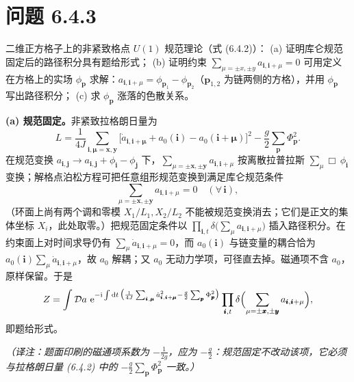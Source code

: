 \section*{问题 6.4.3}
\begin{problem}
二维正方格子上的非紧致格点 $U(1)$ 规范理论（式 (6.4.2)）：
(a) 证明库仑规范固定后的路径积分具有题给形式；
(b) 证明约束 $\sum_{\mu=\pm x,\pm y}a_{\pmb i,\pmb i+\mu}=0$ 可用定义在方格上的实场 $\phi_{\pmb p}$ 求解：$a_{\pmb i,\pmb i+\mu}=\phi_{\pmb p_1}-\phi_{\pmb p_2}$（$\pmb p_{1,2}$ 为链两侧的方格），并用 $\phi_{\pmb p}$ 写出路径积分；
(c) 求 $\phi_{\pmb p}$ 涨落的色散关系。
\end{problem}
\solution

\textbf{(a) 规范固定。}非紧致拉格朗日量为
\begin{equation*}
L=\frac{1}{4J}\sum_{\pmb i,\pmb\mu=\pmb x,\pmb y}\bigl[\dot a_{\pmb i,\pmb i+\pmb\mu}+a_0(\pmb i)-a_0(\pmb i+\pmb\mu)\bigr]^{2}
-\frac{g}{2}\sum_{\pmb p}\Phi_{\pmb p}^{2} .
\end{equation*}
在规范变换 $a_{\pmb i,\pmb j}\to a_{\pmb i,\pmb j}+\phi_{\pmb i}-\phi_{\pmb j}$ 下，$\sum_{\mu=\pm\pmb x,\pm\pmb y}a_{\pmb i,\pmb i+\mu}$ 按离散拉普拉斯 $\sum_\mu\Box\,\phi_{\pmb i}$ 变换；解格点泊松方程可把任意组形规范变换到满足库仑规范条件
\begin{equation*}
\sum_{\mu=\pm\pmb x,\pm\pmb y}a_{\pmb i,\pmb i+\mu}=0\quad(\forall\,\pmb i),
\end{equation*}
（环面上尚有两个调和零模 $X_1/L_1,X_2/L_2$ 不能被规范变换消去；它们是正文的集体坐标 $X_i$，此处取零。）把规范固定条件以 $\prod_{\pmb i,t}\delta\bigl(\sum_{\mu}a_{\pmb i,\pmb i+\mu}\bigr)$ 插入路径积分。在约束面上对时间求导仍有 $\sum_\mu\dot a_{\pmb i,\pmb i+\mu}=0$，而 $a_0(\pmb i)$ 与链变量的耦合恰为 $a_0(\pmb i)\sum_\mu\dot a_{\pmb i,\pmb i+\mu}$，故 $a_0$ 解耦；又 $a_0$ 无动力学项，可径直去掉。磁通项不含 $a_0$，原样保留。于是
\begin{equation*}
Z=\int\mathcal{D}a\ \mathrm{e}^{-\mathrm{i}\int\mathrm{d}t\,\bigl(\frac{1}{4J}\sum_{\pmb i,\pmb\mu}\dot a_{\pmb i,\pmb i+\pmb\mu}^{2}-\frac{g}{2}\sum_{\pmb p}\Phi_{\pmb p}^{2}\bigr)}
\prod_{\pmb i,t}\delta\Bigl(\sum_{\mu=\pm\pmb x,\pm\pmb y}a_{\pmb i,\pmb i+\mu}\Bigr),
\end{equation*}
即题给形式。

\emph{（译注：题面印刷的磁通项系数为 $-\frac{1}{2g}$，应为 $-\frac{g}{2}$：规范固定不改动该项，它必须与拉格朗日量 (6.4.2) 中的 $-\frac{g}{2}\sum_{\pmb p}\Phi_{\pmb p}^{2}$ 一致。）}

